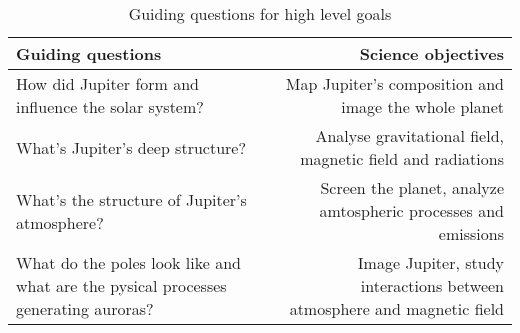 \renewcommand{\arraystretch}{1.5}
\begin{table}[H]
    \centering
    \begin{tabular}{|l|r|}
      
        \hline
        \textbf{Guiding questions} & \textbf{Science objectives} \\ 
        \hline
        How did Jupiter form and influence the solar system? & Map Jupiter's composition and image the whole planet \\ 
        \hline
        What's Jupiter's deep structure? & Analyse gravitational field, magnetic field and radiations  \\ 
        \hline
        What's the structure of Jupiter's atmosphere? & Screen the planet, analyze amtospheric processes and emissions  \\ 
        \hline
        What do the poles look like and what are the pysical processes generating auroras? & Image Jupiter, study interactions between atmosphere and magnetic field \\ 
        \hline
     
    \end{tabular}
    \centering
    \caption{Guiding questions for high level goals}
    \label{tab:Guiding questions for high level goals}
\end{table}

\renewcommand{\arraystretch}{1}

